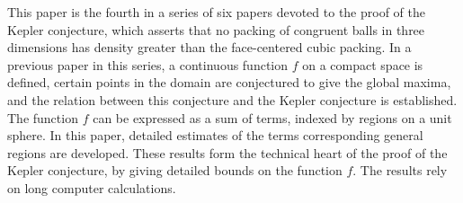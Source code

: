 This paper is the fourth in a series of six papers devoted to the
proof of the Kepler conjecture, which asserts that no packing of
congruent balls in three dimensions has density greater than the
face-centered cubic packing. In a previous paper in this series, a
continuous function $f$ on a compact space is defined, certain
points in the domain are conjectured to give the global maxima, and
the relation between this conjecture and the Kepler conjecture is
established. The function $f$ can be expressed as a sum of terms,
indexed by regions on a unit sphere.  In this paper, detailed
estimates of the terms corresponding general regions are developed.
These results form the technical heart of the proof of the Kepler
conjecture, by giving detailed bounds on the function $f$.  The
results rely on long computer calculations.
